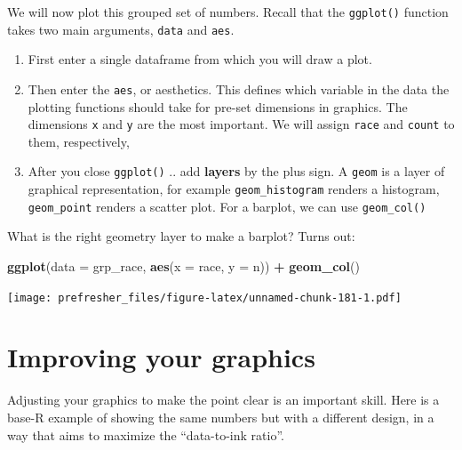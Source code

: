 \documentclass[]{book}
\newenvironment{Shaded}{\begin{snugshade}}{\end{snugshade}}
\newcommand{\DataTypeTok}[1]{\textcolor[rgb]{0.13,0.29,0.53}{#1}}
\newcommand{\KeywordTok}[1]{\textcolor[rgb]{0.13,0.29,0.53}{\textbf{#1}}}
\newcommand{\NormalTok}[1]{#1}
\newcommand{\OperatorTok}[1]{\textcolor[rgb]{0.81,0.36,0.00}{\textbf{#1}}}
\newcommand{\StringTok}[1]{\textcolor[rgb]{0.31,0.60,0.02}{#1}}
\providecommand{\tightlist}{%
  \setlength{\itemsep}{0pt}\setlength{\parskip}{0pt}}
\theoremstyle{definition}
\theoremstyle{definition}
\theoremstyle{definition}
\theoremstyle{remark}
\begin{document}
\begin{Shaded}
\begin{Highlighting}[]
\begin{Shaded}
\begin{Highlighting}[]
We will now plot this grouped set of numbers. Recall that the \texttt{ggplot()} function takes two main arguments, \texttt{data} and \texttt{aes}.

\begin{enumerate}
\def\labelenumi{\arabic{enumi}.}
\tightlist
\item
  First enter a single dataframe from which you will draw a plot.
\item
  Then enter the \texttt{aes}, or aesthetics. This defines which variable in the data the plotting functions should take for pre-set dimensions in graphics. The dimensions \texttt{x} and \texttt{y} are the most important. We will assign \texttt{race} and \texttt{count} to them, respectively,
\item
  After you close \texttt{ggplot()} .. add \textbf{layers} by the plus sign. A \texttt{geom} is a layer of graphical representation, for example \texttt{geom\_histogram} renders a histogram, \texttt{geom\_point} renders a scatter plot. For a barplot, we can use \texttt{geom\_col()}
\end{enumerate}

What is the right geometry layer to make a barplot? Turns out:

\begin{Shaded}
\begin{Highlighting}[]
\KeywordTok{ggplot}\NormalTok{(}\DataTypeTok{data =}\NormalTok{ grp_race, }\KeywordTok{aes}\NormalTok{(}\DataTypeTok{x =}\NormalTok{ race, }\DataTypeTok{y =}\NormalTok{ n)) }\OperatorTok{+}\StringTok{ }\KeywordTok{geom_col}\NormalTok{()}
\end{Highlighting}
\end{Shaded}

\texttt{[image: prefresher\_files/figure-latex/unnamed-chunk-181-1.pdf]}

\hypertarget{improving-your-graphics}{%
\section{Improving your graphics}\label{improving-your-graphics}}

Adjusting your graphics to make the point clear is an important skill. Here is a base-R example of showing the same numbers but with a different design, in a way that aims to maximize the ``data-to-ink ratio''.


\end{Highlighting}
\end{Shaded}
\end{Highlighting}
\end{Shaded}
\end{document}
